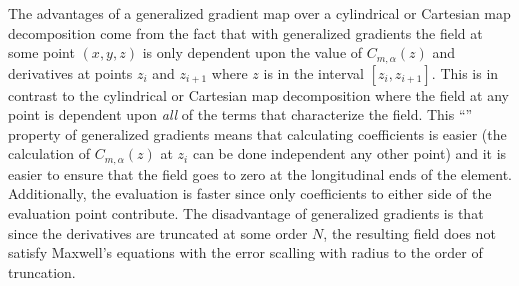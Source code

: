 The advantages of a generalized gradient map over a cylindrical or Cartesian map decomposition come
from the fact that with generalized gradients the field at some point $(x,y,z)$ is only dependent
upon the value of $C_{m,\alpha}(z)$ and derivatives at points $z_i$ and $z_{i+1}$ where $z$ is in
the interval $[z_i, z_{i+1}]$. This is in contrast to the cylindrical or Cartesian map decomposition
where the field at any point is dependent upon {\em all} of the terms that characterize the
field. This ``'' property of generalized gradients means that calculating coefficients
is easier (the calculation of $C_{m,\alpha}(z)$ at $z_i$ can be done independent any other point)
and it is easier to ensure that the field goes to zero at the longitudinal ends of the
element. Additionally, the evaluation is faster since only coefficients to either side of the
evaluation point contribute. The disadvantage of generalized gradients is that since the derivatives
are truncated at some order $N$, the resulting field does not satisfy Maxwell's equations with the
error scalling with radius to the order of truncation.

